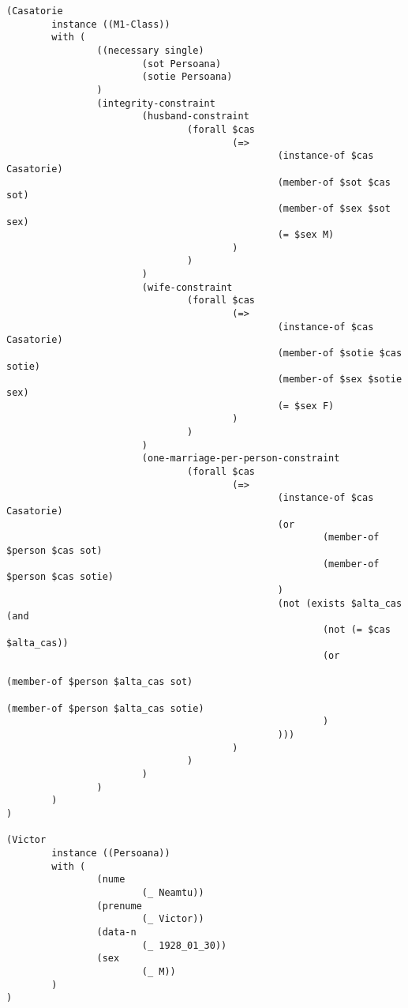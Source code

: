 \documentclass{article}
\begin{document}
{\begin{verbatim}
(Casatorie
        instance ((M1-Class))
        with (
                ((necessary single)
                        (sot Persoana)
                        (sotie Persoana)
                )
                (integrity-constraint
                        (husband-constraint
                                (forall $cas
                                        (=>
                                                (instance-of $cas Casatorie)
                                                (member-of $sot $cas sot)
                                                (member-of $sex $sot sex)
                                                (= $sex M)
                                        )
                                )
                        )
                        (wife-constraint
                                (forall $cas
                                        (=>
                                                (instance-of $cas Casatorie)
                                                (member-of $sotie $cas sotie)
                                                (member-of $sex $sotie sex)
                                                (= $sex F)
                                        )
                                )
                        )
                        (one-marriage-per-person-constraint
                                (forall $cas
                                        (=>
                                                (instance-of $cas Casatorie)
                                                (or
                                                        (member-of $person $cas sot)
                                                        (member-of $person $cas sotie)
                                                )
                                                (not (exists $alta_cas (and
                                                        (not (= $cas $alta_cas))
                                                        (or
                                                                (member-of $person $alta_cas sot)
                                                                (member-of $person $alta_cas sotie)
                                                        )
                                                )))
                                        )
                                )
                        )
                )
        )
)

(Victor
        instance ((Persoana))
        with (
                (nume
                        (_ Neamtu))
                (prenume
                        (_ Victor))
                (data-n
                        (_ 1928_01_30))
                (sex
                        (_ M))
        )
)


\end{verbatim}}
\end{document}
